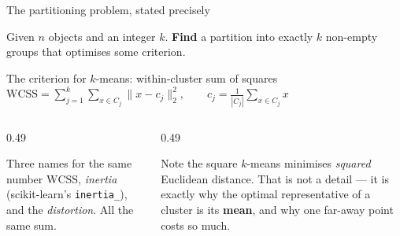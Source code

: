 \documentclass[aspectratio=169]{beamer}
\begin{document}
\begin{frame}[shrink=10]{The partitioning problem, stated precisely}
  \begin{block}{Given}
    $n$ objects and an integer $k$. \textbf{Find} a partition into exactly
    $k$ non-empty groups that optimises some criterion.
  \end{block}
  \begin{exampleblock}{The criterion for $k$-means: within-cluster sum of squares}
    \centering\large
    $\displaystyle
      \mathrm{WCSS} = \sum_{j=1}^{k} \sum_{x \in C_j}
      \lVert x - c_j \rVert_2^2,
      \qquad c_j = \frac{1}{|C_j|}\sum_{x \in C_j} x$
  \end{exampleblock}
  \begin{columns}[T]
    \begin{column}{0.49\textwidth}
      \begin{block}{Three names for the same number}
        \small $\mathrm{WCSS}$, \emph{inertia} (scikit-learn's
        \texttt{inertia\_}), and the \emph{distortion}. All the same sum.
      \end{block}
    \end{column}
    \begin{column}{0.49\textwidth}
      \begin{alertblock}{Note the square}
        \small $k$-means minimises \emph{squared} Euclidean distance. That is
        not a detail --- it is exactly why the optimal representative of a
        cluster is its \textbf{mean}, and why one far-away point costs so
        much.
      \end{alertblock}
    \end{column}
  \end{columns}
\end{frame}
\end{document}
